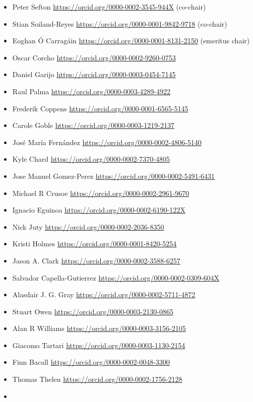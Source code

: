 \begin{itemize}
\item
  Peter Sefton \url{https://orcid.org/0000-0002-3545-944X} (co-chair)
\item
  Stian Soiland-Reyes \url{https://orcid.org/0000-0001-9842-9718} (co-chair)
\item
  Eoghan Ó Carragáin \url{https://orcid.org/0000-0001-8131-2150} (emeritus chair)
\item
  Oscar Corcho \url{https://orcid.org/0000-0002-9260-0753}
\item
  Daniel Garijo \url{https://orcid.org/0000-0003-0454-7145}
\item
  Raul Palma \url{https://orcid.org/0000-0003-4289-4922}
\item
  Frederik Coppens \url{https://orcid.org/0000-0001-6565-5145}
\item
  Carole Goble \url{https://orcid.org/0000-0003-1219-2137}
\item
  José María Fernández \url{https://orcid.org/0000-0002-4806-5140}
\item
  Kyle Chard \url{https://orcid.org/0000-0002-7370-4805}
\item
  Jose Manuel Gomez-Perez \url{https://orcid.org/0000-0002-5491-6431}
\item
  Michael R Crusoe \url{https://orcid.org/0000-0002-2961-9670}
\item
  Ignacio Eguinoa \url{https://orcid.org/0000-0002-6190-122X}
\item
  Nick Juty \url{https://orcid.org/0000-0002-2036-8350}
\item
  Kristi Holmes \url{https://orcid.org/0000-0001-8420-5254}
\item
  Jason A. Clark \url{https://orcid.org/0000-0002-3588-6257}
\item
  Salvador Capella-Gutierrez \url{https://orcid.org/0000-0002-0309-604X}
\item
  Alasdair J. G. Gray \url{https://orcid.org/0000-0002-5711-4872}
\item
  Stuart Owen \url{https://orcid.org/0000-0003-2130-0865}
\item
  Alan R Williams \url{https://orcid.org/0000-0003-3156-2105}
\item
  Giacomo Tartari \url{https://orcid.org/0000-0003-1130-2154}
\item
  Finn Bacall \url{https://orcid.org/0000-0002-0048-3300}
\item
  Thomas Thelen \url{https://orcid.org/0000-0002-1756-2128}
\item

\end{itemize}

